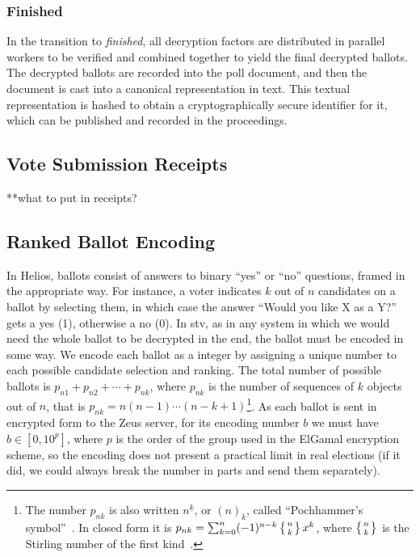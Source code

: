 \documentclass[letterpaper,10pt]{article}
\begin{document}
\subsubsection{Finished}
\label{sec:finished}
In the transition to \emph{finished}, all decryption factors are
distributed in parallel workers to be verified and combined together
to yield the final decrypted ballots.
The decrypted ballots are recorded into the poll document,
and then the document is cast into a canonical representation in text.
This textual representation is hashed to obtain a cryptographically
secure identifier for it, which can be published and recorded
in the proceedings.

\subsection{Vote Submission Receipts}
\label{sec:receipts}
**what to put in receipts?

\subsection{Ranked Ballot Encoding}
\label{sec:ballot_encoding}
In Helios, ballots consist of answers to binary ``yes'' or ``no''
questions, framed in the appropriate way. For instance, a voter
indicates $k$ out of $n$ candidates on a ballot by selecting them, in
which case the answer ``Would you like X as a Y?'' gets a yes (1),
otherwise a no (0). In {\sc stv}, as in any system in which we would need
the whole ballot to be decrypted in the end, the ballot must be
encoded in some way. We encode each ballot as a integer by assigning a
unique number to each possible candidate selection and ranking. The
total number of possible ballots is $p _{n1} + p_{n2} + \cdots + p
_{nk}$, where $p_{nk}$ is the number of sequences of $k$ objects out
of $n$, that is $p_{nk} = n(n - 1)\cdots(n - k + 1)$\footnote{The
  number $p_{nk}$ is also written $n^{\underline{k}}$, or $(n)_k$,
  called ``Pochhammer's symbol''~\cite[p.\ 48]{graham:1994}. In closed
  form it is $p_{nk} = \sum_{k=0}^{n} (-1)^{n-k}\left\{n \atop
    k\right\}x^k$, where $\left\{n \atop k\right\}$ is the Stirling
  number of the first kind~\cite{weisstein:pochhammer}.}. As each
ballot is sent in encrypted form to the Zeus server, for its encoding
number $b$ we must have $b \in [0, 10^p]$, where $p$ is the order of
the group used in the ElGamal encryption scheme, so the encoding does
not present a practical limit in real elections (if it did, we could
always break the number in parts and send them separately).
\end{document}
